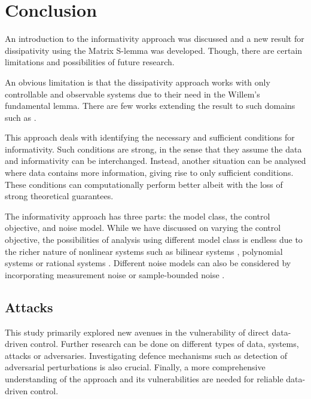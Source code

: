 \chapter{Conclusion}\doublespacing %
\label{chap:attacks} %
An introduction to the informativity approach was discussed and a new result for dissipativity using the Matrix S-lemma was developed. Though, there are certain limitations and possibilities of future research.

An obvious limitation is that the dissipativity approach works with only controllable and observable systems due to their need in the Willem's fundamental lemma. There are few works extending the result to such domains such as \cite{9551767}.

This approach deals with identifying the necessary and sufficient conditions for informativity. Such conditions are strong, in the sense that they assume the data and informativity can be interchanged. Instead, another situation can be analysed where data contains more information, giving rise to only sufficient conditions. These conditions can computationally perform better albeit with the loss of strong theoretical guarantees. 

The informativity approach has three parts: the model class, the control objective, and noise model. While we have discussed on varying the control objective, the possibilities of analysis using different model class is endless due to the richer nature of nonlinear systems such as bilinear systems \cite{Bisoffi2020,Markovsky2022}, polynomial systems \cite{Guo2020,Guo2022} or rational systems \cite{Strasser2021}. Different noise models can also be considered by incorporating measurement noise \cite{Persis2020} or sample-bounded noise \cite{vanWaarde2022b}.
\section{Attacks}
This study primarily explored new avenues in the vulnerability of direct data-driven control. Further research can be done on different types of data, systems, attacks or adversaries. Investigating defence mechanisms such as detection of adversarial perturbations \cite{metzen2017on} is also crucial.
Finally, a more comprehensive understanding of the approach and its vulnerabilities are needed for reliable data-driven control.